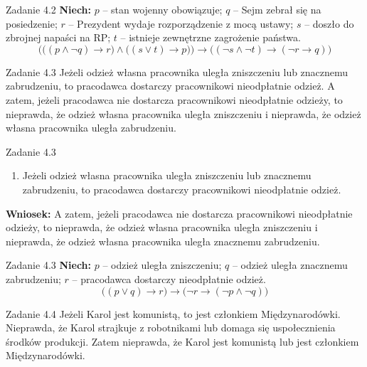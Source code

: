\documentclass[12pt]{beamer}
\begin{document}
\begin{frame}{Zadanie 4.2}
\small
\textbf{Niech:} $p$ -- stan wojenny obowiązuje; $q$ -- Sejm zebrał się na posiedzenie; $r$ -- Prezydent wydaje rozporządzenie z mocą ustawy; $s$ -- doszło do zbrojnej napaści na RP; $t$ -- istnieje zewnętrzne zagrożenie państwa.
\vspace{10pt}
\[ \Big(\big((p \wedge \neg q) \rightarrow r\big) \wedge \big((s \vee t) \rightarrow p\big)\Big) \rightarrow \Big((\neg s \wedge \neg t) \rightarrow (\neg r \rightarrow q)\Big) \]
\end{frame}

\begin{frame}{Zadanie 4.3}
Jeżeli odzież własna pracownika uległa zniszczeniu lub znacznemu zabrudzeniu, to pracodawca dostarczy pracownikowi nieodpłatnie odzież. A zatem, jeżeli pracodawca nie dostarcza pracownikowi nieodpłatnie odzieży, to nieprawda, że odzież własna pracownika uległa zniszczeniu i nieprawda, że odzież własna pracownika uległa zabrudzeniu.
\end{frame}

\begin{frame}{Zadanie 4.3}
\begin{enumerate}
    \item[P1.] Jeżeli odzież własna pracownika uległa zniszczeniu lub znacznemu zabrudzeniu, to pracodawca dostarczy pracownikowi nieodpłatnie odzież.
\end{enumerate}
\vspace{6pt}
\textbf{Wniosek:} A zatem, jeżeli pracodawca nie dostarcza pracownikowi nieodpłatnie odzieży, to nieprawda, że odzież własna pracownika uległa zniszczeniu i nieprawda, że odzież własna pracownika uległa znacznemu zabrudzeniu.
\end{frame}

\begin{frame}{Zadanie 4.3}
\textbf{Niech:} $p$ -- odzież uległa zniszczeniu; $q$ -- odzież uległa znacznemu zabrudzeniu; $r$ -- pracodawca dostarczy nieodpłatnie odzież.
\vspace{10pt}
\[ \big((p \vee q) \rightarrow r\big) \rightarrow \big(\neg r \rightarrow (\neg p \wedge \neg q)\big) \]
\end{frame}

\begin{frame}{Zadanie 4.4}
Jeżeli Karol jest komunistą, to jest członkiem Międzynarodówki. Nieprawda, że Karol strajkuje z robotnikami lub domaga się uspołecznienia środków produkcji. Zatem nieprawda, że Karol jest komunistą lub jest członkiem Międzynarodówki.
\end{frame}
\end{document}
